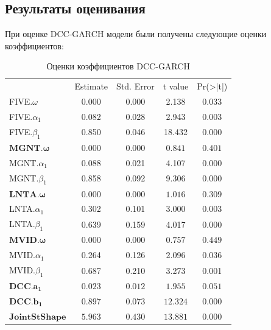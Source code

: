 \documentclass[a4paper,12pt,twoside]{article}
\begin{document}
\subsection{Результаты оценивания}\label{estimation}
При оценке DCC-GARCH модели были получены следующие оценки коэффициентов:
\begin{table}[htbp]
  \centering
  \captionsetup{font=large}
  \caption{Оценки коэффициентов DCC-GARCH}

    \begin{tabular}{lcccc}
        &  Estimate &  Std. Error &  t value & Pr(>|t|) \\
    FIVE.$\omega$ & 0.000 & 0.000 & 2.138 & 0.033 \\
    FIVE.$\alpha_1$ & 0.082 & 0.028 & 2.943 & 0.003 \\
    FIVE.$\beta_1$ & 0.850 & 0.046 & 18.432 & 0.000 \\
    $\mathbf{MGNT.\omega}$ & $\mathbf{0.000}$ & $\mathbf{0.000}$ & $\mathbf{0.841}$ & $\mathbf{0.401}$ \\
    MGNT.$\alpha_1$ & 0.088 & 0.021 & 4.107 & 0.000 \\
    MGNT.$\beta_1$ & 0.858 & 0.092 & 9.306 & 0.000 \\
    $\mathbf{LNTA.\omega}$ & $\mathbf{0.000}$ & $\mathbf{0.000}$ & $\mathbf{1.016}$ & $\mathbf{0.309}$ \\
    LNTA.$\alpha_1$ & 0.302 & 0.101 & 3.000 & 0.003 \\
    LNTA.$\beta_1$ & 0.639 & 0.159 & 4.017 & 0.000 \\
    $\mathbf{MVID.\omega}$ & $\mathbf{0.000}$ & $\mathbf{0.000}$ & $\mathbf{0.757}$ & $\mathbf{0.449}$ \\
    MVID.$\alpha_1$ & 0.264 & 0.126 & 2.096 & 0.036 \\
    MVID.$\beta_1$ & 0.687 & 0.210 & 3.273 & 0.001 \\
    $\mathbf{DCC.a_1}$ & $\mathbf{0.023}$ & $\mathbf{0.012}$ & $\mathbf{1.955}$ & $\mathbf{0.051}$ \\
    $\mathbf{DCC.b_1}$ & $\mathbf{0.897}$ & $\mathbf{0.073}$ & $\mathbf{12.324}$ & $\mathbf{0.000}$ \\
    $\mathbf{JointStShape}$ & $\mathbf{5.963}$ & $\mathbf{0.430}$ & $\mathbf{13.881}$ & $\mathbf{0.000}$ \\
    \end{tabular}%
  \label{tab:addlabel}%
\end{table}%
\end{document}
